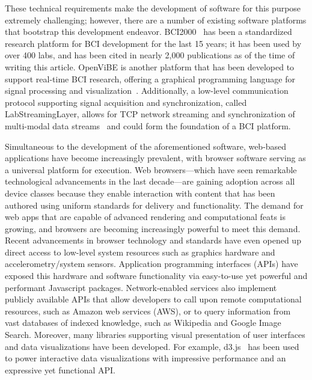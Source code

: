 \documentclass[utf8]{frontiersSCNS}
\begin{document}
These technical requirements make the development of software for this purpose extremely challenging; however, there are a number of existing software platforms that bootstrap this development endeavor.
BCI2000~\citep{schalk_bci2000:_2004} has been a standardized research platform for BCI development for the last 15 years; it has been used by over 400 labs, and has been cited in nearly 2,000 publications as of the time of writing this article.
OpenViBE is another platform that has been developed to support real-time BCI research, offering a graphical programming language for signal processing and visualization~\citep{renard_openvibe:_2010}.
Additionally, a low-level communication protocol supporting signal acquisition and synchronization, called LabStreamingLayer, allows for TCP network streaming and synchronization of multi-modal data streams~\citep{kothe_lab_2014} and could form the foundation of a BCI platform.

Simultaneous to the development of the aforementioned software, web-based applications have become increasingly prevalent, with browser software serving as a universal platform for execution.
Web browsers---which have seen remarkable technological advancements in the last decade---are gaining adoption across all device classes because they enable interaction with content that has been authored using uniform standards for delivery and functionality.
The demand for web apps that are capable of advanced rendering and computational feats is growing, and browsers are becoming increasingly powerful to meet this demand.
Recent advancements in browser technology and standards have even opened up direct access to low-level system resources such as graphics hardware and accelerometry/system sensors.
Application programming interfaces (APIs) have exposed this hardware and software functionality via easy-to-use yet powerful and performant Javascript packages.
Network-enabled services also implement publicly available APIs that allow developers to call upon remote computational resources, such as Amazon web services (AWS), or to query information from vast databases of indexed knowledge, such as Wikipedia and Google Image Search.
Moreover, many libraries supporting visual presentation of user interfaces and data visualizations have been developed.
For example, d3.js~\citep{bostock_d3._2012} has been used to power interactive data visualizations with impressive performance and an expressive yet functional API.
\end{document}
